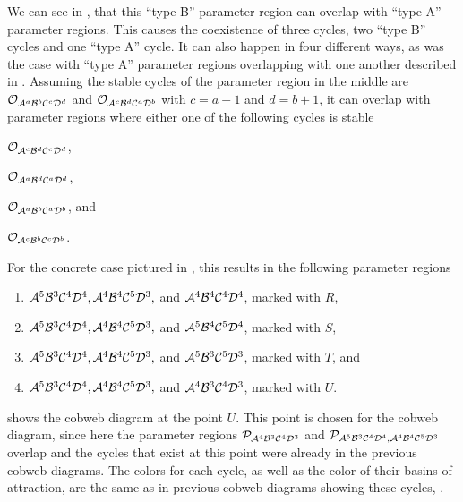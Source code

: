 We can see in , that this ``type B'' parameter region can overlap with ``type A'' parameter regions.
This causes the coexistence of three cycles, two ``type B'' cycles and one ``type A'' cycle.
It can also happen in four different ways, as was the case with ``type A'' parameter regions overlapping with one another described in .
Assuming the stable cycles of the parameter region in the middle are $\mathcal{O}_{\mathcal{A}^a\mathcal{B}^b\mathcal{C}^c\mathcal{D}^d}$ and $\mathcal{O}_{\mathcal{A}^c\mathcal{B}^d\mathcal{C}^a\mathcal{D}^b}$ with $c = a - 1$ and $d = b + 1$, it can overlap with parameter regions where either one of the following cycles is stable
\begin{enumerate*}
	\item $\mathcal{O}_{\mathcal{A}^c\mathcal{B}^d\mathcal{C}^c\mathcal{D}^d}$,
	\item $\mathcal{O}_{\mathcal{A}^a\mathcal{B}^d\mathcal{C}^a\mathcal{D}^d}$,
	\item $\mathcal{O}_{\mathcal{A}^a\mathcal{B}^b\mathcal{C}^a\mathcal{D}^b}$, and
	\item $\mathcal{O}_{\mathcal{A}^c\mathcal{B}^b\mathcal{C}^c\mathcal{D}^b}$.
\end{enumerate*}
For the concrete case pictured in , this results in the following parameter regions
\begin{enumerate}
	\item $\mathcal{A}^5\mathcal{B}^3\mathcal{C}^4\mathcal{D}^4, \mathcal{A}^4\mathcal{B}^4\mathcal{C}^5\mathcal{D}^3,$ and $\mathcal{A}^4\mathcal{B}^4\mathcal{C}^4\mathcal{D}^4$, marked with $R$,
	\item $\mathcal{A}^5\mathcal{B}^3\mathcal{C}^4\mathcal{D}^4, \mathcal{A}^4\mathcal{B}^4\mathcal{C}^5\mathcal{D}^3,$ and $\mathcal{A}^5\mathcal{B}^4\mathcal{C}^5\mathcal{D}^4$, marked with $S$,
	\item $\mathcal{A}^5\mathcal{B}^3\mathcal{C}^4\mathcal{D}^4, \mathcal{A}^4\mathcal{B}^4\mathcal{C}^5\mathcal{D}^3,$ and $\mathcal{A}^5\mathcal{B}^3\mathcal{C}^5\mathcal{D}^3$, marked with $T$, and
	\item $\mathcal{A}^5\mathcal{B}^3\mathcal{C}^4\mathcal{D}^4, \mathcal{A}^4\mathcal{B}^4\mathcal{C}^5\mathcal{D}^3,$ and $\mathcal{A}^4\mathcal{B}^3\mathcal{C}^4\mathcal{D}^3$, marked with $U$.
\end{enumerate}

 shows the cobweb diagram at the point $U$.
This point is chosen for the cobweb diagram, since here the parameter regions $\mathcal{P}_{\mathcal{A}^4\mathcal{B}^3\mathcal{C}^4\mathcal{D}^3}$ and $\mathcal{P}_{\mathcal{A}^5\mathcal{B}^3\mathcal{C}^4\mathcal{D}^4, \mathcal{A}^4\mathcal{B}^4\mathcal{C}^5\mathcal{D}^3}$ overlap and the cycles that exist at this point were already in the previous cobweb diagrams.
The colors for each cycle, as well as the color of their basins of attraction, are the same as in previous cobweb diagrams showing these cycles, .

